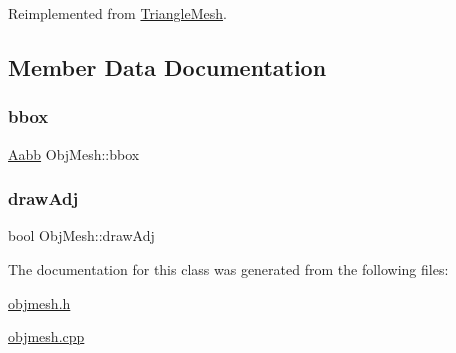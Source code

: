 Reimplemented from \mbox{\hyperlink{class_triangle_mesh_acd43f84016ec88e288df4c0f6739fc70}{Triangle\+Mesh}}.



\subsection{Member Data Documentation}
\mbox{\label{class_obj_mesh_a21ce3155628d670cec7b107959a6788b}} 
\subsubsection{\texorpdfstring{bbox}{bbox}}
{\footnotesize\ttfamily \mbox{\hyperlink{class_aabb}{Aabb}} Obj\+Mesh\+::bbox\hspace{0.3cm}{\ttfamily [protected]}}

\mbox{\label{class_obj_mesh_a1999f87fdd38bb55dd70794bf1352e1a}} 
\subsubsection{\texorpdfstring{drawAdj}{drawAdj}}
{\footnotesize\ttfamily bool Obj\+Mesh\+::draw\+Adj\hspace{0.3cm}{\ttfamily [private]}}



The documentation for this class was generated from the following files\+:\begin{DoxyCompactItemize}
\item 
\mbox{\hyperlink{objmesh_8h}{objmesh.\+h}}\item 
\mbox{\hyperlink{objmesh_8cpp}{objmesh.\+cpp}}\end{DoxyCompactItemize}

